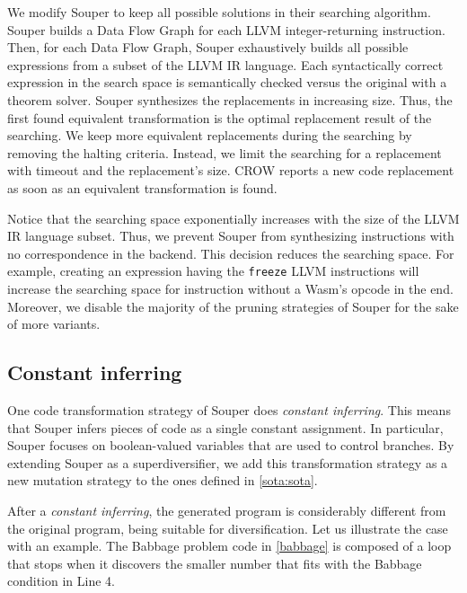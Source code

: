 We modify Souper to keep all possible solutions in their searching algorithm.
Souper builds a Data Flow Graph for each LLVM integer-returning instruction. 
Then, for each Data Flow Graph, Souper exhaustively builds all possible expressions from a subset of the LLVM IR language.
Each syntactically correct expression in the search space is semantically checked versus the original with a theorem solver. Souper synthesizes the replacements in increasing size. Thus, the first found equivalent transformation is the optimal replacement result of the searching. 
We keep more equivalent replacements during the searching by removing the halting criteria. Instead, we limit the searching for a replacement with timeout and the replacement's size. CROW reports a new code replacement as soon as an equivalent transformation is found.

Notice that the searching space exponentially increases with the size of the LLVM IR language subset. Thus,
we prevent Souper from synthesizing instructions with no correspondence in the \wasm backend. This decision reduces the searching space. For example, creating an expression having the  \texttt{freeze} LLVM instructions will increase the searching space for instruction without a Wasm's opcode in the end.
Moreover, we disable the majority of the pruning strategies of Souper for the sake of more variants. 

\subsection{Constant inferring}

One code transformation strategy of Souper does \emph{constant inferring}. This means that Souper infers pieces of code as a single constant assignment. In particular, Souper focuses on boolean-valued variables that are used to control branches.
By extending Souper as a superdiversifier, we add this transformation strategy as a new mutation strategy to the ones defined in \autoref{sota:sota}. 


After a \emph{constant inferring}, the generated program is considerably different from the original program, being suitable for diversification.
Let us illustrate the case with an example.
The Babbage problem code in \autoref{babbage} is composed of a loop that stops when it discovers the smaller number that fits with the Babbage condition in Line 4.


